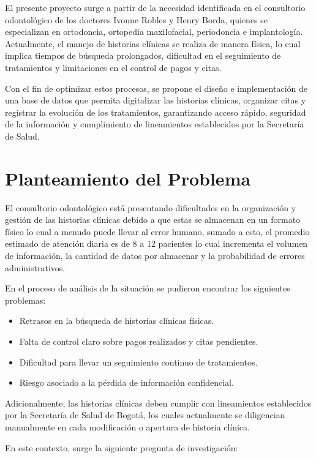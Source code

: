 \documentclass[conference]{IEEEtran}
\begin{document}
El presente proyecto surge a partir de la necesidad identificada en el consultorio odontológico de los doctores Ivonne Robles y Henry Borda, quienes se especializan en ortodoncia, ortopedia maxilofacial, periodoncia e implantología. Actualmente, el manejo de historias clínicas se realiza de manera física, lo cual implica tiempos de búsqueda prolongados, dificultad en el seguimiento de tratamientos y limitaciones en el control de pagos y citas.

Con el fin de optimizar estos procesos, se propone el diseño e implementación de una base de datos que permita digitalizar las historias clínicas, organizar citas y registrar la evolución de los tratamientos, garantizando acceso rápido, seguridad de la información y cumplimiento de lineamientos establecidos por la Secretaría de Salud. 

\section{Planteamiento del Problema}

El consultorio odontológico está presentando dificultades en la organización y gestión de las historias clínicas debido a que estas se almacenan en un formato físico lo cual a menudo puede llevar al error humano, sumado a esto, el promedio estimado de atención diaria es de 8 a 12 pacientes lo cual incrementa el volumen de información, la cantidad de datos por almacenar y la probabilidad de errores administrativos.

En el proceso de análisis de la situación se pudieron encontrar los siguientes problemas:

\begin{itemize}
    \item Retrasos en la búsqueda de historias clínicas físicas.
    \item Falta de control claro sobre pagos realizados y citas pendientes.
    \item Dificultad para llevar un seguimiento continuo de tratamientos.
    \item Riesgo asociado a la pérdida de información confidencial.
\end{itemize}

Adicionalmente, las historias clínicas deben cumplir con lineamientos establecidos por la Secretaría de Salud de Bogotá, los cuales actualmente se diligencian manualmente en cada modificación o apertura de historia clínica.

En este contexto, surge la siguiente pregunta de investigación:
\end{document}
